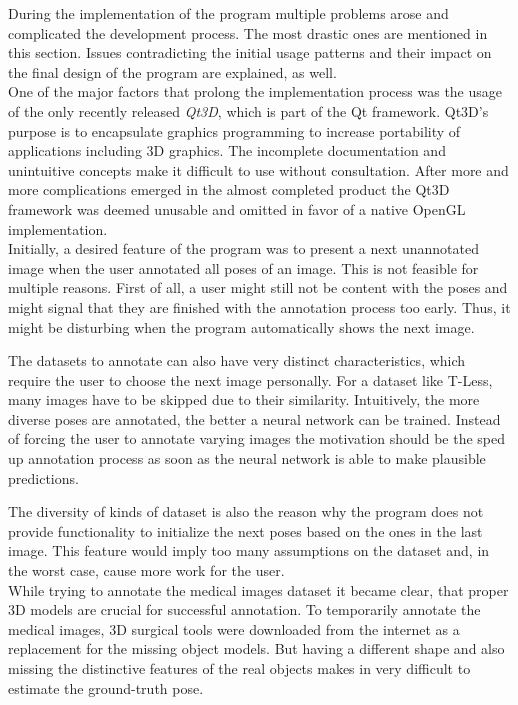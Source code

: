 During the implementation of the program multiple problems arose and complicated the development process. The most drastic ones are mentioned in this section. Issues contradicting the initial usage patterns and their impact on the final design of the program are explained, as well. \\

One of the major factors that prolong the implementation process was the usage of the only recently released \textit{Qt3D}, which is part of the Qt framework. Qt3D's purpose is to encapsulate graphics programming to increase portability of applications including 3D graphics. The incomplete documentation and unintuitive concepts make it difficult to use without consultation. After more and more complications emerged in the almost completed product the Qt3D framework was deemed unusable and omitted in favor of a native OpenGL implementation. \\

Initially, a desired feature of the program was to present a next unannotated image when the user annotated all poses of an image. This is not feasible for multiple reasons. First of all, a user might still not be content with the poses and might signal that they are finished with the annotation process too early. Thus, it might be disturbing when the program automatically shows the next image. 

The datasets to annotate can also have very distinct characteristics, which require the user to choose the next image personally. For a dataset like T-Less, many images have to be skipped due to their similarity. Intuitively, the more diverse poses are annotated, the better a neural network can be trained. Instead of forcing the user to annotate varying images the motivation should be the sped up annotation process as soon as the neural network is able to make plausible predictions. 

The diversity of kinds of dataset is also the reason why the program does not provide functionality to initialize the next poses based on the ones in the last image. This feature would imply too many assumptions on the dataset and, in the worst case, cause more work for the user. \\

While trying to annotate the medical images dataset it became clear, that proper 3D models are crucial for successful annotation. To temporarily annotate the medical images, 3D surgical tools were downloaded from the internet as a replacement for the missing object models. But having a different shape and also missing the distinctive features of the real objects makes in very difficult to estimate the ground-truth pose. 

